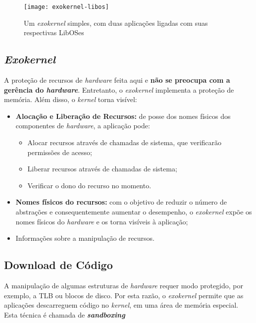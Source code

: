 \begin{figure}[h]
  \centering
  \texttt{[image: exokernel-libos]}
  \caption{Um \textit{exokernel} simples, com duas aplicações ligadas com suas respectivas LibOSes}
  \label{fig:exokernel-libos}
\end{figure}

\subsection{\textit{Exokernel}}
A proteção de recursos de \textit{hardware} feita aqui e \textbf{não se preocupa com a gerência do \textit{hardware}}. Entretanto, o \textit{exokernel} implementa a proteção de memória. Além disso, o \textit{kernel} torna visível:
\begin{itemize}

  \item \textbf{Alocação e Liberação de Recursos:} de posse dos nomes físicos dos componentes de \textit{hardware}, a aplicação pode:
  \begin{itemize}
    \item Alocar recursos através de chamadas de sistema, que verificarão permissões de acesso;

    \item Liberar recursos através de chamadas de sistema;

    \item Verificar o dono do recurso no momento.
  \end{itemize}

  \item \textbf{Nomes físicos do recursos:} com o objetivo de reduzir o número de abstrações e consequentemente aumentar o desempenho, o \textit{exokernel} expõe os nomes físicos do \textit{hardware} e os torna visíveis à aplicação;

  \item Informações sobre a manipulação de recursos.
\end{itemize}


\subsection{Download de Código}
A manipulação de algumas estruturas de \textit{hardware} requer modo protegido, por exemplo, a TLB ou blocos de disco. Por esta razão, o \textit{exokernel} permite que as aplicações descarreguem código no \textit{kernel}, em uma área de memória especial. Esta técnica é chamada de \textbf{\textit{sandboxing}}

